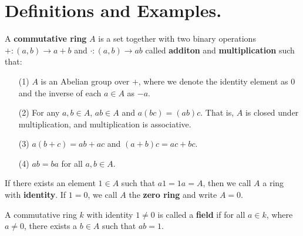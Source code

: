 \section{Definitions and Examples.}
\label{section1}

\begin{definition}
    A \textbf{commutative ring} $A$ is a set together with two binary operations
    $+:(a,b) \xrightarrow{} a+b$ and $\cdot:(a,b) \xrightarrow{} ab$ called
    \textbf{additon} and \textbf{multiplication} such that:
    \begin{enumerate}
        \item[(1)] $A$ is an Abelian group over $+$, where we denote the
            identity element as $0$ and the inverse of each $a \in A$ as $-a$.

        \item[(2)] For any $a,b \in A$,  $ab \in A$ and $a(bc)=(ab)c$. That is,
            $A$ is closed under multiplication, and  multiplication is
            associative.

        \item[(3)] $a(b+c)=ab+ac$ and $(a+b)c=ac+bc$.

        \item[(4)] $ab=ba$ for all  $a,b \in A$.
    \end{enumerate}
     If there exists an element $1 \in A$ such that  $a1=1a=A$, then we call
     $A$ a ring with \textbf{identity}. If $1=0$, we call  $A$ the  \textbf{zero
     ring} and write $A=0$.
\end{definition}

\begin{definition}
    A commutative ring $k$ with identity $1 \neq 0$ is called a
    \textbf{field} if for all $a \in k$, where  $a \neq 0$, there exists
    a $b \in A$ such that $ab=1$.
\end{definition}

